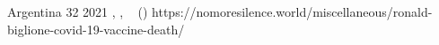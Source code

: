           {
            Argentina
          }
          {
            32
          }
          {
          }
          {
            2021
          }
          {
            ,
            , \
             ()
          }
          {
            https://nomoresilence.world/miscellaneous/ronald-biglione-covid-19-vaccine-death/
          }
          
